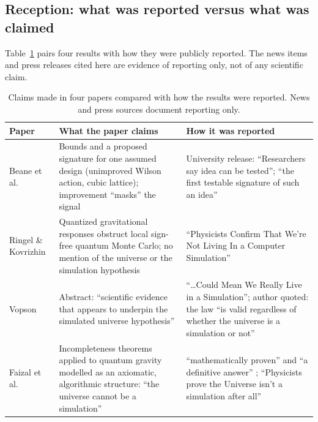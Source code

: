 \subsection{Reception: what was reported versus what was claimed}
\label{sec:methodology:reception}

Table~\ref{tab:reception} pairs four results with how they were publicly
reported. The news items and press releases cited here are evidence of
reporting only, not of any scientific claim.

\begin{table}[t]
\centering
\footnotesize
\caption{Claims made in four papers compared with how the results were
reported. News and press sources document reporting only.}
\label{tab:reception}
\begin{tabular}{p{}p{}p{}}
\hline
Paper & What the paper claims & How it was reported \\
\hline
Beane et al.\ \cite{Beane2014constraints} & Bounds and a proposed signature for one assumed design (unimproved Wilson action, cubic lattice); improvement ``masks'' the signal & University release: ``Researchers say idea can be tested''; ``the first testable signature of such an idea'' \cite{UW2012do} \\
Ringel \& Kovrizhin \cite{Ringel2017quantized} & Quantized gravitational responses obstruct local sign-free quantum Monte Carlo; no mention of the universe or the simulation hypothesis & ``Physicists Confirm That We're Not Living In a Computer Simulation'' \cite{Eck2017physicists} \\
Vopson \cite{Vopson2023second} & Abstract: ``scientific evidence that appears to underpin the simulated universe hypothesis'' & ``\ldots Could Mean We Really Live in a Simulation''; author quoted: the law ``is valid regardless of whether the universe is a simulation or not'' \cite{Ferreira2023mind} \\
Faizal et al.\ \cite{Faizal2025consequences} & Incompleteness theorems applied to quantum gravity modelled as an axiomatic, algorithmic structure: ``the universe cannot be a simulation'' & ``mathematically proven'' and ``a definitive answer'' \cite{UBCO2025ubco}; ``Physicists prove the Universe isn't a simulation after all'' \cite{ScienceDaily2025physicists} \\
\hline
\end{tabular}
\end{table}

